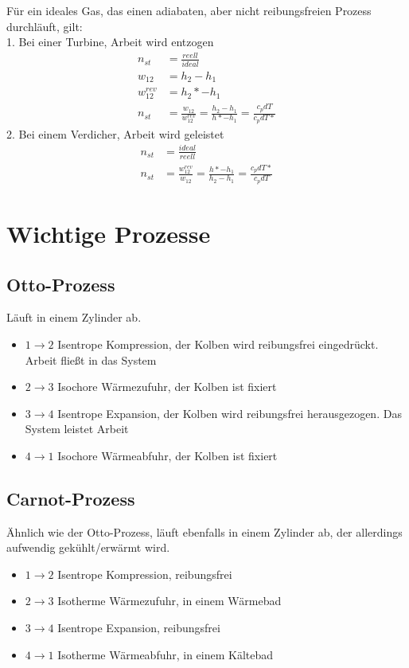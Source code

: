\documentclass[12pt]{article}
\begin{document}
\begin{tcolorbox}[colback=backblue,colframe=borderblue,title=Important]
Für ein ideales Gas, das einen adiabaten, aber nicht reibungsfreien Prozess durchläuft, gilt:\\
1. Bei einer Turbine, Arbeit wird entzogen
\begin{align*}
n_{st}&=\frac{reell}{ideal}\\
w_{12}&=h_2-h_1\\
w_{12}^{rev}&=h_2*-h_1\\
n_{st}&=\frac{w_{12}}{w_{12}^{rev}}=\frac{h_2-h_1}{h*-h_1}=\frac{c_pdT}{c_pdT*}
\end{align*}
2. Bei einem Verdicher, Arbeit wird geleistet
\begin{align*}
n_{st}&=\frac{ideal}{reell}\\
n_{st}&=\frac{w_{12}^{rev}}{w_{12}}=\frac{h*-h_1}{h_2-h_1}=\frac{c_pdT*}{c_pdT}
\end{align*}
\end{tcolorbox}

\pagebreak
\section{Wichtige Prozesse}

\subsection{Otto-Prozess}
Läuft in einem Zylinder ab.
\begin{itemize}
\item $1 \rightarrow 2$ Isentrope Kompression, der Kolben wird reibungsfrei eingedrückt. Arbeit fließt in das System
\item $2 \rightarrow 3$ Isochore Wärmezufuhr, der Kolben ist fixiert
\item $3 \rightarrow 4$ Isentrope Expansion, der Kolben wird reibungsfrei herausgezogen. Das System leistet Arbeit
\item $4 \rightarrow 1$ Isochore Wärmeabfuhr, der Kolben ist fixiert
\end{itemize}

\subsection{Carnot-Prozess}
Ähnlich wie der Otto-Prozess, läuft ebenfalls in einem Zylinder ab, der allerdings aufwendig gekühlt/erwärmt wird.
\begin{itemize}
\item $1 \rightarrow 2$ Isentrope Kompression, reibungsfrei
\item $2 \rightarrow 3$ Isotherme Wärmezufuhr, in einem Wärmebad
\item $3 \rightarrow 4$ Isentrope Expansion, reibungsfrei
\item $4 \rightarrow 1$ Isotherme Wärmeabfuhr, in einem Kältebad
\end{itemize}
\end{document}
